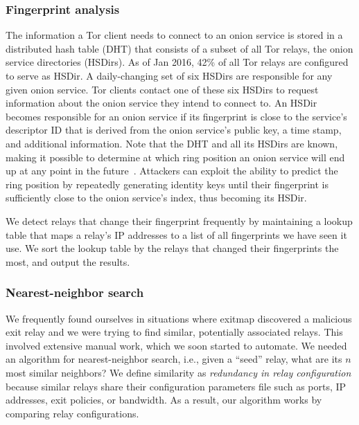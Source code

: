 \subsubsection{Fingerprint analysis}
\label{sec:fingerprint-analysis}
The information a Tor client needs to connect to an onion service is stored in a
distributed hash table (DHT) that consists of a subset of all Tor relays, the
onion service directories (HSDirs).  As of Jan 2016, 42\% of all Tor relays are
configured to serve as HSDir.  A daily-changing set of six HSDirs are
responsible for any given onion service.  Tor clients contact one of these six
HSDirs to request information about the onion service they intend to connect to.
An HSDir becomes responsible for an onion service if its fingerprint is close to
the service's descriptor ID that is derived from the onion service's public key,
a time stamp, and additional information.
Note that the DHT and all its HSDirs are known, making it possible to determine
at which ring position an onion service will end up at any point in the
future~\cite{Biryukov2013a}.  Attackers can exploit the ability to predict the
ring position by repeatedly generating identity keys until their fingerprint is
sufficiently close to the onion service's index, thus becoming its HSDir.

We detect relays that change their fingerprint frequently by maintaining a
lookup table that maps a relay's IP addresses to a list of all fingerprints we
have seen it use.  We sort the lookup table by the relays that changed their
fingerprints the most, and output the results.

\subsubsection{Nearest-neighbor search}
\label{sec:nearest-neighbor}
We frequently found ourselves in situations where exitmap discovered a malicious
exit relay and we were trying to find similar, potentially associated relays.
This involved extensive manual work, which we soon started to automate.  We
needed an algorithm for nearest-neighbor search, i.e., given a ``seed'' relay,
what are its $n$ most similar neighbors?  We define similarity as
\emph{redundancy in relay configuration} because similar relays share their
configuration parameters file such as ports, IP addresses, exit policies, or
bandwidth.  As a result, our algorithm works by comparing relay configurations.

